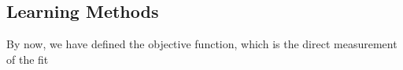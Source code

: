 \subsection {Learning Methods}
By now, we have defined the objective function, which is the direct measurement of the fit